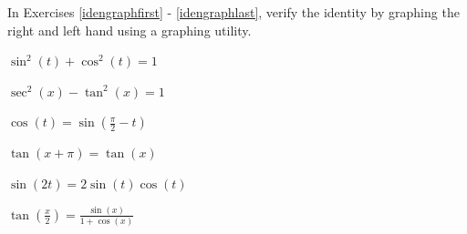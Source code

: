 \documentclass{ximera}
\begin{document}
\begin{question}
In Exercises \ref{idengraphfirst} - \ref{idengraphlast}, verify the identity by graphing the right and left hand using a graphing utility.

\begin{problem}\label{idengraphfirst} 
$\sin^{2}(t) + \cos^{2}(t) = 1$
\end{problem}

\begin{problem}
$\sec^{2}(x) - \tan^{2}(x) = 1$
\end{problem}

\begin{problem}
$\cos(t) = \sin\left(\frac{\pi}{2} - t\right)$
\end{problem}

\begin{problem}
$\tan(x+\pi) = \tan(x)$ 
\end{problem}
 
\begin{problem}
$\sin(2t) = 2\sin(t)\cos(t)$
\end{problem}  

\begin{problem}\label{idengraphlast}
$\tan\left(\frac{x}{2}\right) = \frac{\sin(x)}{1+\cos(x)}$ 
\end{problem}

\end{question}
\end{document}
